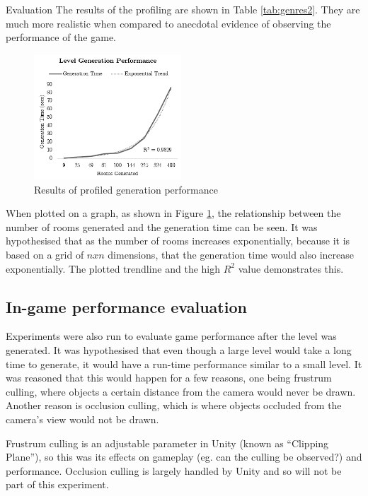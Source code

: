\documentclass[final]{cmpreport}
\begin{document}
\begin{section}{Evaluation}
The results of the profiling are shown in Table \ref{tab:genres2}. They are much more realistic when compared to anecdotal evidence of observing the performance of the game.

\begin{figure}
    \centering
    \includegraphics[width=0.49\textwidth]{img/genperftable.png}
    \caption{Results of profiled generation performance}
    \label{fig:genperftable}
\end{figure}

When plotted on a graph, as shown in Figure \ref{fig:genperftable}, the relationship between the number of rooms generated and the generation time can be seen. It was hypothesised that as the number of rooms increases exponentially, because it is based on a grid of $n x n$ dimensions, that the generation time would also increase exponentially. The plotted trendline and the high $R^2$ value demonstrates this. 

\subsection{In-game performance evaluation}
Experiments were also run to evaluate game performance after the level was generated. It was hypothesised that even though a large level would take a long time to generate, it would have a run-time performance similar to a small level. It was reasoned that this would happen for a few reasons, one being frustrum culling, where objects a certain distance from the camera would never be drawn. Another reason is occlusion culling, which is where objects occluded from the camera's view would not be drawn.

Frustrum culling is an adjustable parameter in Unity (known as ``Clipping Plane''), so this was its effects on gameplay (eg. can the culling be observed?) and performance. Occlusion culling is largely handled by Unity and so will not be part of this experiment.


\end{section}
\end{document}
